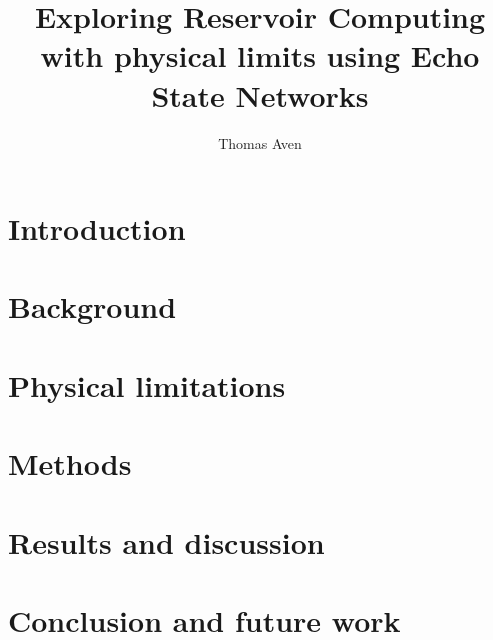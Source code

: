 \documentclass[journal]{IEEEtran}
\begin{document}
\title{Exploring Reservoir Computing with physical limits using Echo State Networks}
\author{Thomas Aven}
\date{}
\maketitle



\section{Introduction}


\section{Background}


\section{Physical limitations}


\section{Methods}


\section{Results and discussion}


\section{Conclusion and future work}





\end{document}
